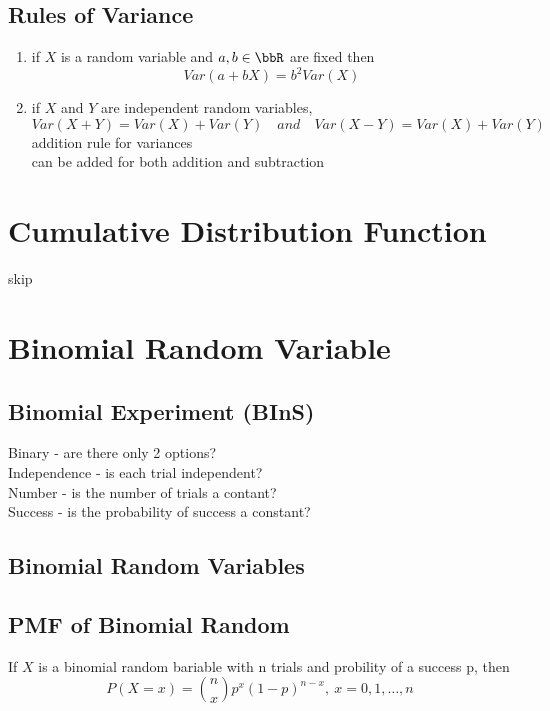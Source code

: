 \subsection{Rules of Variance}  %
\begin{enumerate}
    \item if $X$ is a random variable and $a, b\in\bbR$ are fixed then
    \begin{equation}
        Var(a+bX)=b^2 Var(X)
    \end{equation}
    \item if $X$ and $Y$ are independent random variables,
    \begin{equation}
        Var(X+Y)=Var(X)+Var(Y)\quad and\quad Var(X-Y)=Var(X)+Var(Y)
    \end{equation}
    addition rule for variances \\
    can be added for both addition and subtraction \\
\end{enumerate}

\section{Cumulative Distribution Function}  %
skip

\section{Binomial Random Variable}  %
\subsection{Binomial Experiment (BInS)}  %
Binary - are there only 2 options? \\
Independence - is each trial independent? \\
Number - is the number of trials a contant? \\
Success - is the probability of success a constant?
\subsection{Binomial Random Variables}  %

\subsection{PMF of Binomial Random }  %
If $X$ is a binomial random bariable with n trials and probility of a success p, then
\begin{equation}
    P(X=x)=\binom{n}{x}p^x(1-p)^{n-x},\ x=0,1,\ldots, n
\end{equation}


